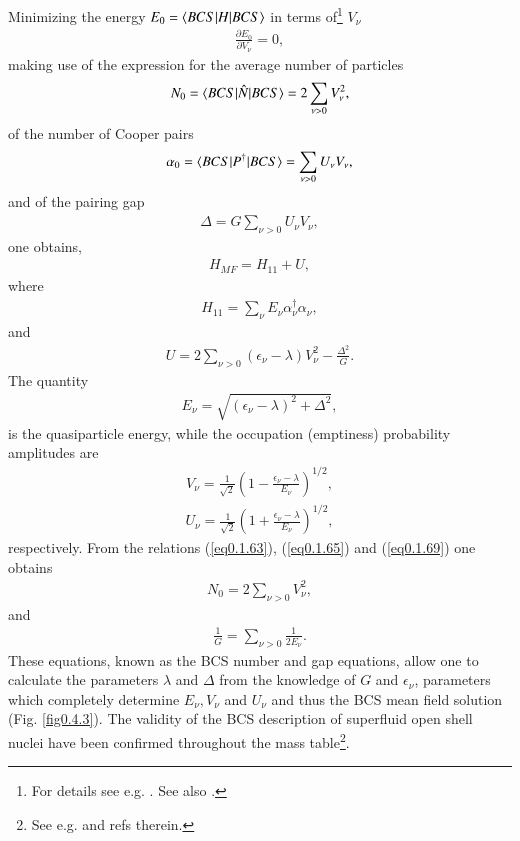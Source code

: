 Minimizing the energy $E_0=\langle {BCS|H|BCS} \rangle$ in terms of\footnote{For details see e.g. \cite{Ragnarsson:05}. See also \cite{Nathan:65}.} $V_\nu$
\begin{align}\label{eq0.1.62}
\frac{\partial E_0}{\partial V_\nu}=0,
\end{align}
 making use of the expression for the average number of particles
\begin{align}\label{eq0.1.63}
N_0=\langle {BCS|\hat N|BCS} \rangle=2\sum_{\nu>0}V_\nu^2,
\end{align}
 of the number of Cooper pairs
\begin{align}\label{eq0.1.64}
\alpha_0=\langle {BCS|P^\dagger|BCS} \rangle=\sum_{\nu>0}U_\nu V_\nu,
\end{align}
and of the pairing gap
\begin{align}\label{eq0.1.65}
\Delta=G\sum_{\nu>0}U_\nu V_{\nu},
\end{align}
one obtains,
\begin{align}\label{eq0.1.66}
H_{MF}=H_{11}+U,
\end{align}
where 
\begin{align}\label{eq0.1.67}
H_{11}=\sum_\nu E_\nu \alpha^\dagger_\nu\alpha_\nu,
\end{align}
and
\begin{align}\label{eq0.1.68}
U=2\sum_{\nu>0}(\epsilon_\nu-\lambda)V^2_\nu-\frac{\Delta^2}{G}.
\end{align}
The quantity
\begin{align}\label{eq0.1.69}
E_\nu=\sqrt{(\epsilon_\nu-\lambda)^2+\Delta^2},
\end{align}
is the quasiparticle energy, while the occupation (emptiness) probability amplitudes are
\begin{align}\label{eq0.1.70}
V_\nu=\frac{1}{\sqrt{2}}\left(1-\frac{\epsilon_\nu-\lambda}{E_\nu}\right)^{1/2},
\end{align}
\begin{align}\label{eq0.1.71}
U_\nu=\frac{1}{\sqrt{2}}\left(1+\frac{\epsilon_\nu-\lambda}{E_\nu}\right)^{1/2},
\end{align}
 respectively. From the relations (\ref{eq0.1.63}),  (\ref{eq0.1.65}) and (\ref{eq0.1.69}) one obtains
\begin{align}\label{eq0.1.72}
N_0=2\sum_{\nu>0}V^2_\nu,
\end{align}
 and 
\begin{align}\label{eq0.1.73}
\frac{1}{G}=\sum_{\nu>0}\frac{1}{2E_\nu}.
\end{align}
These equations, known as the BCS number and gap equations, allow one to calculate the parameters $\lambda$ and $\Delta$ from the knowledge of $G$ and $\epsilon_\nu$, parameters which completely determine $E_\nu,V_\nu$ and $U_\nu$ and thus the BCS mean field solution (Fig. \ref{fig0.4.3}). The validity of the BCS description of superfluid open shell nuclei have been confirmed throughout the mass table\footnote{See e.g. \cite{Broglia:13} and refs therein.}. 

